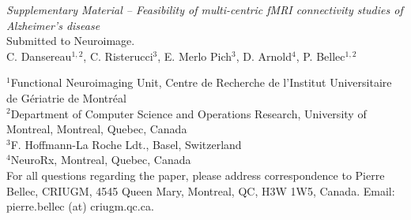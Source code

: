 \documentclass[authoryear]{elsarticle}
\begin{document}
\clearpage
\pagebreak
\renewcommand{\thefigure}{S\arabic{figure}}
\renewcommand{\thetable}{S\arabic{table}}
\setcounter{figure}{0}
\begin{center}
\emph{Supplementary Material {--} Feasibility of multi-centric fMRI connectivity studies of Alzheimer's disease}\\

\vspace{\baselineskip}Submitted to Neuroimage.\\

\vspace{\baselineskip}C. Dansereau$^{1,2}$,  C. Risterucci$^{3}$, E. Merlo Pich$^{3}$, D. Arnold$^{4}$, P. Bellec$^{1,2}$\\

\end{center}
$^1$Functional Neuroimaging Unit, Centre de Recherche de l'Institut Universitaire de G\'eriatrie de Montr\'eal\\
$^2$Department of Computer Science and Operations Research, University of Montreal, Montreal, Quebec, Canada\\
$^3$F. Hoffmann-La Roche Ldt., Basel, Switzerland\\
$^4$NeuroRx, Montreal, Quebec, Canada\\

For all questions regarding the paper, please address correspondence to Pierre Bellec, CRIUGM, 4545 Queen Mary, Montreal, QC, H3W 1W5, Canada. Email: pierre.bellec (at) criugm.qc.ca.\\
\end{document}
